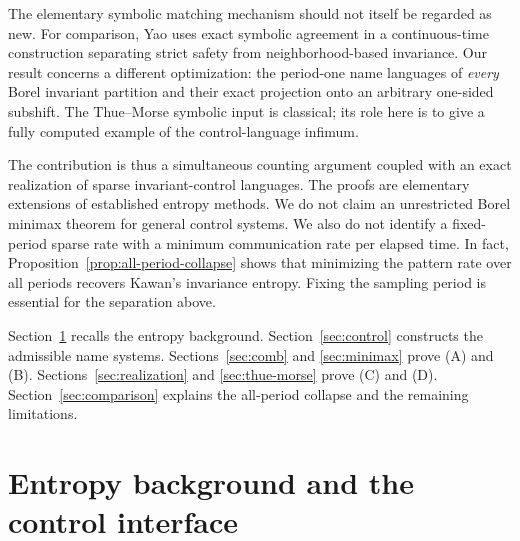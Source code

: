 \documentclass[11pt,reqno]{amsart}
\numberwithin{equation}{section}
\theoremstyle{definition}
\begin{document}
The elementary symbolic matching mechanism should not itself be regarded
as new. For comparison, Yao \cite[Theorem~3.1 and Proposition~4.5]{Yao2026}
uses exact symbolic agreement in a continuous-time construction separating
strict safety from neighborhood-based invariance. Our result concerns a
different optimization: the period-one name languages of \emph{every}
Borel invariant partition and their exact projection onto an arbitrary
one-sided subshift. The Thue--Morse symbolic input is classical; its
role here is to give a fully computed example of the control-language
infimum.

The contribution is thus a simultaneous counting argument coupled with an
exact realization of sparse invariant-control languages. The proofs are
elementary extensions of established entropy methods. We do not claim an
unrestricted Borel minimax theorem for general control systems. We also
do not identify a fixed-period sparse rate with a minimum communication
rate per elapsed time. In fact, Proposition~\ref{prop:all-period-collapse} shows that
minimizing the pattern rate over all periods recovers Kawan's invariance
entropy. Fixing the sampling period is essential for the separation above.

Section~\ref{sec:background} recalls the entropy background.
Section~\ref{sec:control} constructs the admissible name systems.
Sections~\ref{sec:comb} and \ref{sec:minimax} prove (A) and (B).
Sections~\ref{sec:realization} and \ref{sec:thue-morse} prove (C) and (D).
Section~\ref{sec:comparison} explains the all-period collapse and the
remaining limitations.

\section{Entropy background and the control interface}\label{sec:background}
\end{document}
